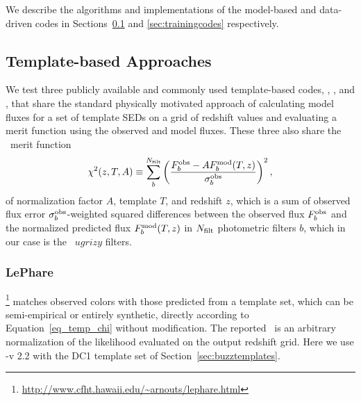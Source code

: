 We describe the algorithms and implementations of the model-based and data-driven codes in Sections~\ref{sec:templatecodes} and \ref{sec:trainingcodes} respectively.

\subsection{Template-based Approaches}
\label{sec:templatecodes}

We test three publicly available and commonly used template-based codes, \lephare, \bpz, and \eazy, that share the standard physically motivated approach of calculating model fluxes for a set of template SEDs on a grid of redshift values and evaluating a merit function using the observed and model fluxes.
These three also share the \chisq\ merit function
\begin{equation}
	\label{eq_temp_chi}
	\chi^{2}(z, T, A) \equiv \sum_{b}^{N_{\rm{filt}}} \left(\frac{F^{\rm{obs}}_{b} - A F^{\rm{mod}}_{b}(T, z)}{\sigma^{\rm{obs}}_{b}}\right)^{2},
\end{equation}
of normalization factor $A$, template $T$, and redshift $z$, which is a sum of observed flux error $\sigma_{b}^{\rm{obs}}$-weighted squared differences between the observed flux $F^{\rm{obs}}_{b}$ and the normalized predicted flux $F^{\rm{mod}}_{b}(T, z)$ in $N_{\rm{filt}}$ photometric filters $b$, which in our case is the \lsst\ $ugrizy$ filters.

\subsubsection{LePhare}
\label{sec:lephare}

\lephare \footnote{\url{http://www.cfht.hawaii.edu/~arnouts/lephare.html}}\citep[Photometric Analysis for Redshift Estimate,][]{Arnouts:99,Ilbert:06} matches observed colors with those predicted from a template set, which can be semi-empirical or entirely synthetic, directly according to Equation~\ref{eq_temp_chi} without modification.
The reported \pzpdf\ is an arbitrary normalization of the likelihood evaluated on the output redshift grid.
Here we use \lephare-v 2.2 with the DC1 template set of Section~\ref{sec:buzztemplates}.

